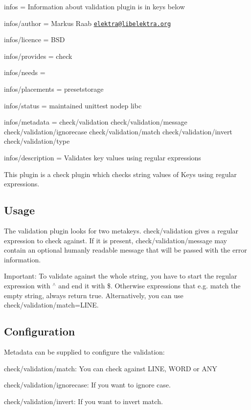 
\begin{DoxyItemize}
\item infos = Information about validation plugin is in keys below
\item infos/author = Markus Raab \href{mailto:elektra@libelektra.org}{\tt elektra@libelektra.\+org}
\item infos/licence = B\+S\+D
\item infos/provides = check
\item infos/needs =
\item infos/placements = presetstorage
\item infos/status = maintained unittest nodep libc
\item infos/metadata = check/validation check/validation/message check/validation/ignorecase check/validation/match check/validation/invert check/validation/type
\item infos/description = Validates key values using regular expressions
\end{DoxyItemize}

This plugin is a check plugin which checks string values of Keys using regular expressions.

\subsection*{Usage}

The validation plugin looks for two metakeys. {\ttfamily check/validation} gives a regular expression to check against. If it is present, {\ttfamily check/validation/message} may contain an optional humanly readable message that will be passed with the error information.

Important\+: To validate against the whole string, you have to start the regular expression with {\ttfamily $^\wedge$} and end it with {\ttfamily \$}. Otherwise expressions that e.\+g. match the empty string, always return true. Alternatively, you can use {\ttfamily check/validation/match=L\+I\+N\+E}.

\subsection*{Configuration}

Metadata can be supplied to configure the validation\+:


\begin{DoxyItemize}
\item {\ttfamily check/validation/match}\+: You can check against {\ttfamily L\+I\+N\+E}, {\ttfamily W\+O\+R\+D} or {\ttfamily A\+N\+Y}
\item {\ttfamily check/validation/ignorecase}\+: If you want to ignore case.
\item {\ttfamily check/validation/invert}\+: If you want to invert match.
\end{DoxyItemize}

